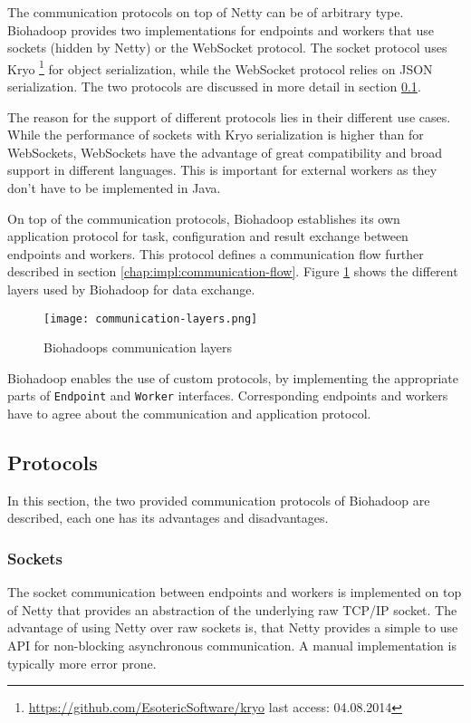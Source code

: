 The communication protocols on top of Netty can be of arbitrary type. Biohadoop provides two implementations for endpoints and workers that use sockets (hidden by Netty) or the WebSocket protocol. The socket protocol uses Kryo \footnote{\url{https://github.com/EsotericSoftware/kryo} last access: 04.08.2014} for object serialization, while the WebSocket protocol relies on JSON serialization. The two protocols are discussed in more detail in section \ref{chap:impl:protocols}.

The reason for the support of different protocols lies in their different use cases. While the performance of sockets with Kryo serialization is higher than for WebSockets, WebSockets have the advantage of great compatibility and broad support in different languages. This is important for external workers as they don't have to be implemented in Java.

On top of the communication protocols, Biohadoop establishes its own application protocol for task, configuration and result exchange between endpoints and workers. This protocol defines a communication flow further described in section \ref{chap:impl:communication-flow}. Figure \ref{fig:communication-layers} shows the different layers used by Biohadoop for data exchange.

\begin{figure}
  \centering
  \texttt{[image: communication-layers.png]}
  \caption[Biohadoops communication layers]{Biohadoops communication layers}
  \label{fig:communication-layers}
\end{figure}

Biohadoop enables the use of custom protocols, by implementing the appropriate parts of \texttt{Endpoint} and \texttt{Worker} interfaces. Corresponding endpoints and workers have to agree about the communication and application protocol.

\subsection{Protocols}
\label{chap:impl:protocols}
In this section, the two provided communication protocols of Biohadoop are described, each one has its advantages and disadvantages.

\subsubsection{Sockets}
The socket communication between endpoints and workers is implemented on top of Netty that provides an abstraction of the underlying raw TCP/IP socket. The advantage of using Netty over raw sockets is, that Netty provides a simple to use API for non-blocking asynchronous communication. A manual implementation is typically more error prone.

